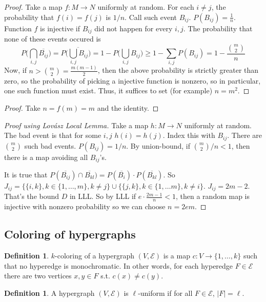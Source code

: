\documentclass{article}
\theoremstyle{plain}
\theoremstyle{definition}
\newtheorem{defn}[thm]{Definition}
\begin{document}
\begin{proof}
	Take a map $f:M\rightarrow {N}$ uniformly at random. For each $i\neq j$, the probability that $f(i)=f(j)$ is $1/n$. Call such event $B_{ij}$. $P(B_{ij})=\frac{1}{n}$. Function $f$ is injective if $B_{ij}$ did not happen for every $i,j$. The probability that none of these events occured is $$P\bigg(\bigcap_{i,j}\overline{B_{ij}}\bigg)=P\bigg(\overline{\bigcup_{i,j}B_{ij}}\bigg)=1-P\bigg(\bigcup_{i,j}B_{ij}\bigg)\geq 1-\sum_{i,j}P(B_{ij})=1-\frac{{m\choose 2}}{n}$$ Now, if $n > {m\choose 2}=\frac{m(m-1)}{2}$, then the above probability is strictly greater than zero, so the probability of picking a injective function is nonzero, so in particular, one such function must exist. Thus, it suffices to set (for example) $n = m^2$.
\end{proof}

\begin{proof}
	Take $n=f(m)=m$ and the identity.
\end{proof}
\begin{proof}[Proof using Lovász Local Lemma]
	Take a map $h:M\rightarrow N$ uniformly at random. The bad event is that for some $i,j$ $h(i)=h(j)$. Index this with $B_{ij}$. There are ${m\choose 2}$ such bad events. $P(B_{ij})=1/n$. By union-bound, if ${m\choose 2} / n < 1$, then there is a map avoiding all $B_{ij}$'s.
	
	It is true that $P(\overline{B_{ij}})\cap \overline{B_{kl}})=P(\overline{B_i})\cdot P(\overline{B_{kl}})$. So $J_{ij}=\{\{i,k\},k\in\{1,\ldots,m\},k\neq j\}\cup\{\{j,k\},k\in\{1,\ldots m\},k\neq i\}$. $J_{ij}=2m-2$. That's the bound $D$ in LLL. So by LLL if $e\cdot\frac{2m-1}{n}<1$, then a random map is injective with nonzero probability so we can choose $n=2em$.
\end{proof}

\subsection{Coloring of hypergraphs}

\begin{defn}
	$k$-coloring of a hypergraph $(V,\mathcal{E})$ is a map $c:V\rightarrow \{1,\ldots, k\}$ such that no hyperedge is monochromatic. In other words, for each hyperedge $F \in \mathcal{E}$ there are two vertices $x,y\in F$ s.t. $c(x)\neq c(y)$.
\end{defn}

\begin{defn}
	A hypergraph $(V,\mathcal{E})$ is $\ell$-uniform if for all $F\in \mathcal{E}$, $|F|=\ell$.
\end{defn}
\end{document}
